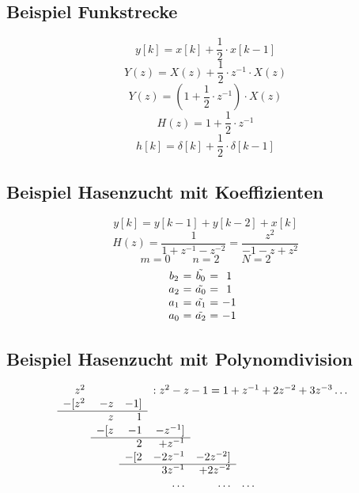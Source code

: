 \documentclass[a4paper, 10pt, fleqn]{article}
\begin{document}
\subsection{Beispiel Funkstrecke}
\[ y[k] = x[k] + \frac{1}{2} \cdot x[k - 1] \]
\[ Y(z) = X(z) + \frac{1}{2} \cdot z^{-1} \cdot X(z) \]
\[ Y(z) = \left( 1 + \frac{1}{2} \cdot z^{-1} \right) \cdot X(z) \]
\[ H(z) = 1 + \frac{1}{2} \cdot z^{-1} \]
\[ h[k] = \delta[k] + \frac{1}{2} \cdot \delta[k - 1] \]

\subsection{Beispiel Hasenzucht mit Koeffizienten}
\[ y[k] = y[k-1] + y[k-2] + x[k] \]
\[ H(z) = \frac{1}{1 + z^{-1} - z^{-2}} = \frac{z^{2}}{-1 - z + z^2} \]
\[ m = 0 \qquad n = 2 \qquad N = 2 \]
\[
    \begin{array}{@{}c@{~=~}c@{~=~}c}
        b_2 & \tilde{b_0} & 1 \\
        a_2 & \tilde{a_0} & 1 \\
        a_1 & \tilde{a_1} & -1\\
        a_0 & \tilde{a_2} & -1\\
    \end{array}
\]

\subsection{Beispiel Hasenzucht mit Polynomdivision}
\[
    \begin{array}{rrrrrl}
          z^2   &       &       & \multicolumn{3}{l}{: z^2 - z - 1 = 1 + z^{-1} + 2 z^{-2} + 3 z^{-3} \ldots} \\
        -[z^2   & -z    & -1] \\
        \cline{1-3}
                &  z    &  1 \\
                &-[  z  & -1    & -z^{-1}] \\
                \cline{2-4}
                &       & 2     & +z^{-1} \\
                &       &-[  2  & -2z^{-1}  & -2z^{-2}] \\
                \cline{3-5}
                &       &       & 3z^{-1}   & +2z^{-2} \\
                &       &       & \ldots    & \ldots    & \ldots \\
    \end{array}
\]
\end{document}
